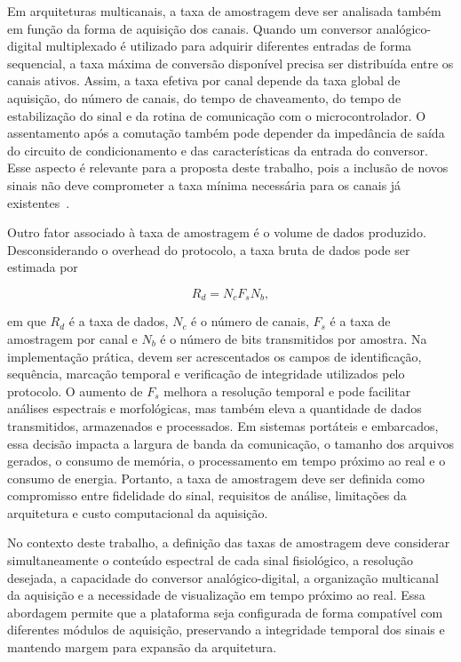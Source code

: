 \documentclass[a4paper,12pt]{fcte}
\begin{document}
Em arquiteturas multicanais, a taxa de amostragem deve ser analisada também em função da forma de aquisição dos canais. Quando um conversor analógico-digital multiplexado é utilizado para adquirir diferentes entradas de forma sequencial, a taxa máxima de conversão disponível precisa ser distribuída entre os canais ativos. Assim, a taxa efetiva por canal depende da taxa global de aquisição, do número de canais, do tempo de chaveamento, do tempo de estabilização do sinal e da rotina de comunicação com o microcontrolador. O assentamento após a comutação também pode depender da impedância de saída do circuito de condicionamento e das características da entrada do conversor. Esse aspecto é relevante para a proposta deste trabalho, pois a inclusão de novos sinais não deve comprometer a taxa mínima necessária para os canais já existentes~\cite{devi2020realtimedaq}.

Outro fator associado à taxa de amostragem é o volume de dados produzido. Desconsiderando o overhead do protocolo, a taxa bruta de dados pode ser estimada por

\begin{equation}
    R_d = N_c F_s N_b,
\end{equation}

\noindent em que $R_d$ é a taxa de dados, $N_c$ é o número de canais, $F_s$ é a taxa de amostragem por canal e $N_b$ é o número de bits transmitidos por amostra. Na implementação prática, devem ser acrescentados os campos de identificação, sequência, marcação temporal e verificação de integridade utilizados pelo protocolo. O aumento de $F_s$ melhora a resolução temporal e pode facilitar análises espectrais e morfológicas, mas também eleva a quantidade de dados transmitidos, armazenados e processados. Em sistemas portáteis e embarcados, essa decisão impacta a largura de banda da comunicação, o tamanho dos arquivos gerados, o consumo de memória, o processamento em tempo próximo ao real e o consumo de energia. Portanto, a taxa de amostragem deve ser definida como compromisso entre fidelidade do sinal, requisitos de análise, limitações da arquitetura e custo computacional da aquisição.

No contexto deste trabalho, a definição das taxas de amostragem deve considerar simultaneamente o conteúdo espectral de cada sinal fisiológico, a resolução desejada, a capacidade do conversor analógico-digital, a organização multicanal da aquisição e a necessidade de visualização em tempo próximo ao real. Essa abordagem permite que a plataforma seja configurada de forma compatível com diferentes módulos de aquisição, preservando a integridade temporal dos sinais e mantendo margem para expansão da arquitetura.
\end{document}
